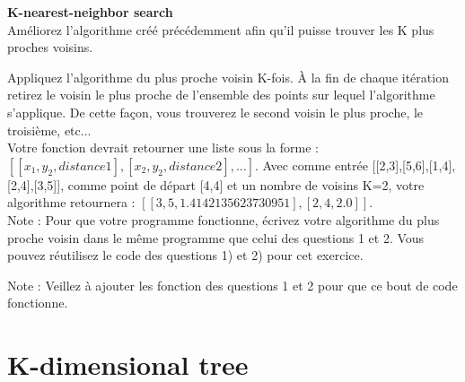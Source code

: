 \begin{Exercice}[15 minutes]\textbf{K-nearest-neighbor search}\\

Améliorez l'algorithme créé précédemment afin qu'il puisse trouver les K plus proches voisins.\\

\begin{conseil}
Appliquez l'algorithme du plus proche voisin K-fois. À la fin de chaque itération retirez le voisin le plus proche de l'ensemble des points sur lequel l'algorithme s'applique. De cette façon, vous trouverez le second voisin le plus proche, le troisième, etc...\\

Votre fonction devrait retourner une liste sous la forme : $[[x_1,y_2, distance1],[x_2,y_2,distance2],...]$. Avec comme entrée [[2,3],[5,6],[1,4],[2,4],[3,5]], comme point de départ [4,4] et un nombre de voisins K=2, votre algorithme retournera : $[[3, 5, 1.4142135623730951], [2, 4, 2.0]]$.\\

Note : Pour que votre programme fonctionne, écrivez votre algorithme du plus proche voisin dans le même programme que celui des questions 1 et 2. Vous pouvez réutilisez le code des questions 1) et 2) pour cet exercice.
\end{conseil}

\begin{solution}
    Note : Veillez à ajouter les fonction des questions 1 et 2 pour que ce bout de code fonctionne.
    
\end{solution}
\end{Exercice}
\newpage
\section{K-dimensional tree}

